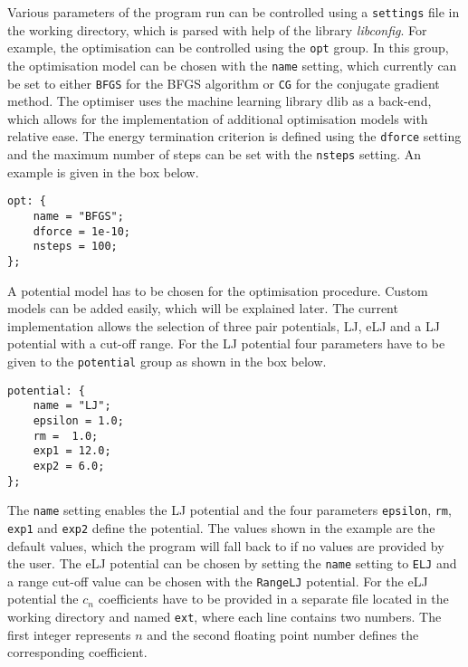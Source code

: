 Various parameters of the program run can be controlled using a
\texttt{settings} file in the working directory, which is parsed with help of
the library
\textit{libconfig}.\autocite{Lindner_libconfiglibraryprocessing_2018} For
example, the optimisation can be controlled using the \texttt{opt} group. In
this group, the optimisation model can be chosen with the \texttt{name} setting,
which currently can be set to either \texttt{BFGS} for the \acf{BFGS} algorithm
or \texttt{CG} for the conjugate gradient method. The optimiser uses the machine
learning library dlib\autocite{King_DlibmlMachineLearning_2009} as a back-end,
which allows for the implementation of additional optimisation models with
relative ease. The energy termination criterion is defined using the
\texttt{dforce} setting and the maximum number of steps can be set with the
\texttt{nsteps} setting. An example is given in the box below.
%
\begin{Verbatim}[frame=single,label=settings file - opt tag]
opt: {
    name = "BFGS";
    dforce = 1e-10;
    nsteps = 100;
};
\end{Verbatim}
%
A potential model has to be chosen for the optimisation procedure. Custom models
can be added easily, which will be explained later. The current implementation
allows the selection of three pair potentials, \ac{LJ}, \ac{eLJ} and a \ac{LJ}
potential with a cut-off range. For the \ac{LJ} potential four parameters have
to be given to the \texttt{potential} group as shown in the box below.
%
\begin{Verbatim}[frame=single,label=settings file - potential tag]
potential: {
    name = "LJ";
    epsilon = 1.0;
    rm =  1.0;
    exp1 = 12.0;
    exp2 = 6.0;
};
\end{Verbatim}
%
The \texttt{name} setting enables the \ac{LJ} potential and the four parameters
\texttt{epsilon}, \texttt{rm}, \texttt{exp1} and \texttt{exp2} define the
potential. The values shown in the example are the default values, which the
program will fall back to if no values are provided by the user. The \ac{eLJ}
potential can be chosen by setting the \texttt{name} setting to \texttt{ELJ} and
a range cut-off value can be chosen with the \texttt{RangeLJ} potential. For the
\ac{eLJ} potential the $c_n$ coefficients have to be provided in a separate file
located in the working directory and named \texttt{ext}, where each line
contains two numbers. The first integer represents $n$ and the second floating
point number defines the corresponding coefficient.

